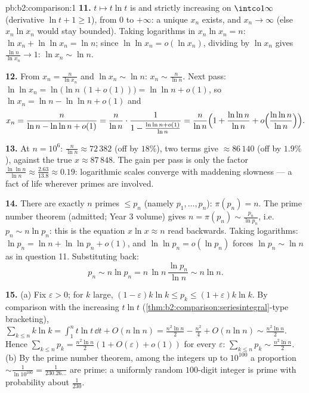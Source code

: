 \begin{solution}{pb:b2:comparison:1}
\textbf{11.} $t \mapsto t\ln t$ is  and strictly
increasing on $\intco1\infty$ (derivative $\ln t + 1 \geq 1$),
from $0$ to $+\infty$: a unique $x_n$ exists, and $x_n \to
\infty$ (else $x_n\ln x_n$ would stay bounded). Taking
logarithms in $x_n\ln x_n = n$: $\ln x_n + \ln\ln x_n = \ln n$;
since $\ln\ln x_n = o(\ln x_n)$, dividing by $\ln x_n$ gives
$\frac{\ln n}{\ln x_n} \to 1$: $\ln x_n \sim \ln n$.

\textbf{12.} From $x_n = \frac{n}{\ln x_n}$ and $\ln x_n \sim
\ln n$: $x_n \sim \frac{n}{\ln n}$. Next pass: $\ln\ln x_n =
\ln\bigl(\ln n\,(1 + o(1))\bigr) = \ln\ln n + o(1)$, so $\ln
x_n = \ln n - \ln\ln n + o(1)$ and
\[
x_n = \frac{n}{\ln n - \ln\ln n + o(1)}
= \frac{n}{\ln n}\cdot\frac{1}{1 - \frac{\ln\ln n +
o(1)}{\ln n}}
= \frac{n}{\ln n}\Bigl(1 + \frac{\ln\ln n}{\ln n} +
o\Bigl(\frac{\ln\ln n}{\ln n}\Bigr)\Bigr).
\]

\textbf{13.} At $n = 10^6$: $\frac{n}{\ln n} \approx 72\,382$
(off by $18\%$), two terms give $\approx 86\,140$ (off by
$1.9\%$), against the true $x \approx 87\,848$. The gain per
pass is only the factor $\frac{\ln\ln n}{\ln n} \approx
\frac{2.63}{13.8} \approx 0.19$: logarithmic scales converge
with maddening slowness --- a fact of life wherever primes are
involved.

\textbf{14.} There are exactly $n$ primes $\leq p_n$ (namely
$p_1, \dots, p_n$): $\pi(p_n) = n$. The prime number theorem
(admitted; Year 3 volume) gives $n = \pi(p_n) \sim
\frac{p_n}{\ln p_n}$, i.e.\ $p_n \sim n\ln p_n$: this is the
equation $x\ln x \approx n$ read backwards. Taking logarithms:
$\ln p_n = \ln n + \ln\ln p_n + o(1)$, and $\ln\ln p_n =
o(\ln p_n)$ forces $\ln p_n \sim \ln n$ as in question 11.
Substituting back:
\[
p_n \sim n\ln p_n = n\,\ln n\,\frac{\ln p_n}{\ln n} \sim n\ln
n .
\]

\textbf{15.} (a) Fix $\varepsilon > 0$; for $k$ large, $(1 -
\varepsilon)k\ln k \leq p_k \leq (1 + \varepsilon)k\ln k$. By
comparison with the increasing $t\ln t$
(\cref{thm:b2:comparison:seriesintegral}-type bracketing),
$\sum_{k\leq n}k\ln k = \int_1^n t\ln t\,\dd t + O(n\ln n) =
\frac{n^2\ln n}2 - \frac{n^2}4 + O(n\ln n) \sim
\frac{n^2\ln n}2$. Hence $\sum_{k\leq n}p_k = \frac{n^2\ln
n}{2}(1 + O(\varepsilon) + o(1))$ for every $\varepsilon$:
$\sum_{k\leq n}p_k \sim \frac{n^2\ln n}2$. (b) By the prime
number theorem, among the integers up to $10^{100}$ a
proportion $\sim \frac{1}{\ln 10^{100}} = \frac1{230.26\dots}$
are prime: a uniformly random $100$-digit integer is prime
with probability about $\frac1{230}$.


\end{solution}
